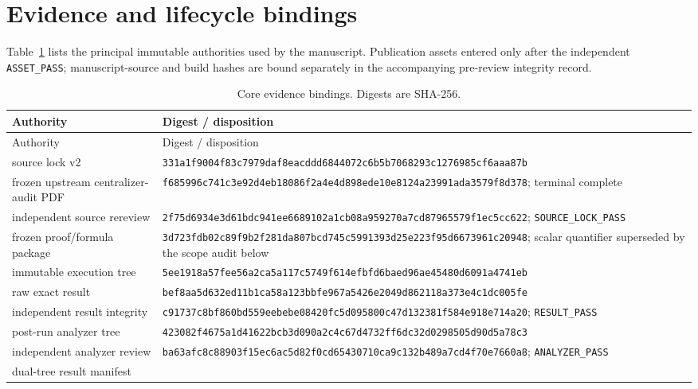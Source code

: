 \documentclass[11pt]{article}
\theoremstyle{definition}
\theoremstyle{remark}
\begin{document}
\section{Evidence and lifecycle bindings}
\label{app:provenance}

Table~\ref{tab:provenance} lists the principal immutable authorities used by
the manuscript.  Publication assets entered only after the independent
\texttt{ASSET\_PASS}; manuscript-source and build hashes are bound separately
in the accompanying pre-review integrity record.

\begin{longtable}{@{}p{}p{}@{}}
  \caption{Core evidence bindings.  Digests are SHA-256.}
  \label{tab:provenance}\\
  \toprule
  Authority & Digest / disposition \\
  \midrule
  \endfirsthead
  \toprule
  Authority & Digest / disposition \\
  \midrule
  \endhead
  source lock v2
    & \nolinkurl{331a1f9004f83c7979daf8eacddd6844072c6b5b7068293c1276985cf6aaa87b} \\
  frozen upstream centralizer-audit PDF
    & \nolinkurl{f685996c741c3e92d4eb18086f2a4e4d898ede10e8124a23991ada3579f8d378};
      terminal complete \\
  independent source rereview
    & \nolinkurl{2f75d6934e3d61bdc941ee6689102a1cb08a959270a7cd87965579f1ec5cc622};
      \texttt{SOURCE\_LOCK\_PASS} \\
  frozen proof/formula package
    & \nolinkurl{3d723fdb02c89f9b2f281da807bcd745c5991393d25e223f95d6673961c20948};
      scalar quantifier superseded by the scope audit below \\
  immutable execution tree
    & \nolinkurl{5ee1918a57fee56a2ca5a117c5749f614efbfd6baed96ae45480d6091a4741eb} \\
  raw exact result
    & \nolinkurl{bef8aa5d632ed11b1ca58a123bbfe967a5426e2049d862118a373e4c1dc005fe} \\
  independent result integrity
    & \nolinkurl{c91737c8bf860bd559eebebe08420fc5d095800c47d132381f584e918e714a20};
      \texttt{RESULT\_PASS} \\
  post-run analyzer tree
    & \nolinkurl{423082f4675a1d41622bcb3d090a2c4c67d4732ff6dc32d0298505d90d5a78c3} \\
  independent analyzer review
    & \nolinkurl{ba63afc8c88903f15ec6ac5d82f0cd65430710ca9c132b489a7cd4f70e7660a8};
      \texttt{ANALYZER\_PASS} \\
  dual-tree result manifest

\end{longtable}
\end{document}
